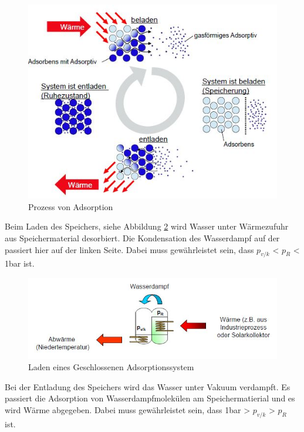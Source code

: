 \documentclass[11pt,a4paper]{scrartcl}
\begin{document}
\begin{figure}[h!]
\begin{center}
\includegraphics[scale=0.6]{images/prozess.jpg}
\caption{Prozess von Adsorption}
\label{fig:adsorption}
\end{center}
\end{figure}

Beim Laden des Speichers, siehe Abbildung \ref{fig:geschlossenerladen} wird
Wasser unter Wärmezufuhr aus Speichermaterial desorbiert. Die Kondensation des
Wasserdampf auf der passiert hier auf der linken Seite. Dabei muss gewährleistet
sein, dass $p_{v/k}$ < $p_R$ < 1bar ist.

\begin{figure}[h!]
\begin{center}
\includegraphics[scale=0.6]{images/geschlossenerladen.jpg}
\caption{Laden eines Geschlossenen Adsorptionssystem \cite{zeosys}}
\label{fig:geschlossenerladen}
\end{center}
\end{figure}

Bei der Entladung des Speichers wird das Wasser unter Vakuum verdampft. Es
passiert die Adsorption von Wasserdampfmolekülen am Speichermatierial und es
wird Wärme abgegeben. Dabei muss gewährleistet sein, dass 1bar > $p_{v/k}$ >
$p_R$ ist.
\end{document}
